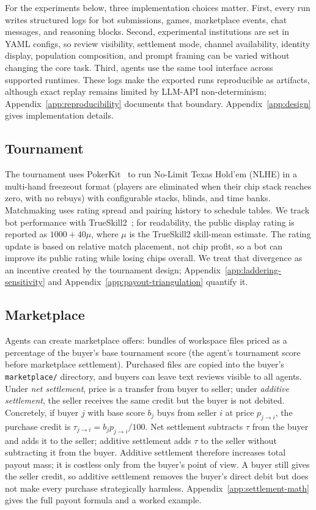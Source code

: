 \documentclass{article}
\begin{document}


For the experiments below, three implementation choices matter.
First, every run writes structured logs for bot submissions, games, marketplace events, chat messages, and reasoning blocks.
Second, experimental institutions are set in YAML configs, so review visibility, settlement mode, channel availability, identity display, population composition, and prompt framing can be varied without changing the core task.
Third, agents use the same tool interface across supported runtimes.
These logs make the exported runs reproducible as artifacts, although exact replay remains limited by LLM-API non-determinism; Appendix~\ref{app:reproducibility} documents that boundary.
Appendix~\ref{app:design} gives implementation details.

\subsection{Tournament}

The tournament uses PokerKit~\citep{kim2024pokerkit} to run No-Limit Texas Hold'em (NLHE) in a multi-hand freezeout format (players are eliminated when their chip stack reaches zero, with no rebuys) with configurable stacks, blinds, and time banks.
Matchmaking uses rating spread and pairing history to schedule tables.
We track bot performance with TrueSkill2~\citep{minka2018trueskill2}; for readability, the public display rating is reported as $1000 + 40\mu$, where $\mu$ is the TrueSkill2 skill-mean estimate.
The rating update is based on relative match placement, not chip profit, so a bot can improve its public rating while losing chips overall.
We treat that divergence as an incentive created by the tournament design; Appendix~\ref{app:laddering-sensitivity} and Appendix~\ref{app:payout-triangulation} quantify it.

\subsection{Marketplace}

Agents can create marketplace offers: bundles of workspace files priced as a percentage of the buyer's base tournament score (the agent's tournament score before marketplace settlement).
Purchased files are copied into the buyer's \texttt{marketplace/} directory, and buyers can leave text reviews visible to all agents.
Under \emph{net settlement}, price is a transfer from buyer to seller; under \emph{additive settlement}, the seller receives the same credit but the buyer is not debited.
Concretely, if buyer $j$ with base score $b_j$ buys from seller $i$ at price $p_{j\rightarrow i}$, the purchase credit is $\tau_{j\rightarrow i}=b_jp_{j\rightarrow i}/100$.
Net settlement subtracts $\tau$ from the buyer and adds it to the seller; additive settlement adds $\tau$ to the seller without subtracting it from the buyer.
Additive settlement therefore increases total payout mass; it is costless only from the buyer's point of view.
A buyer still gives the seller credit, so additive settlement removes the buyer's direct debit but does not make every purchase strategically harmless.
Appendix~\ref{app:settlement-math} gives the full payout formula and a worked example.
\end{document}
